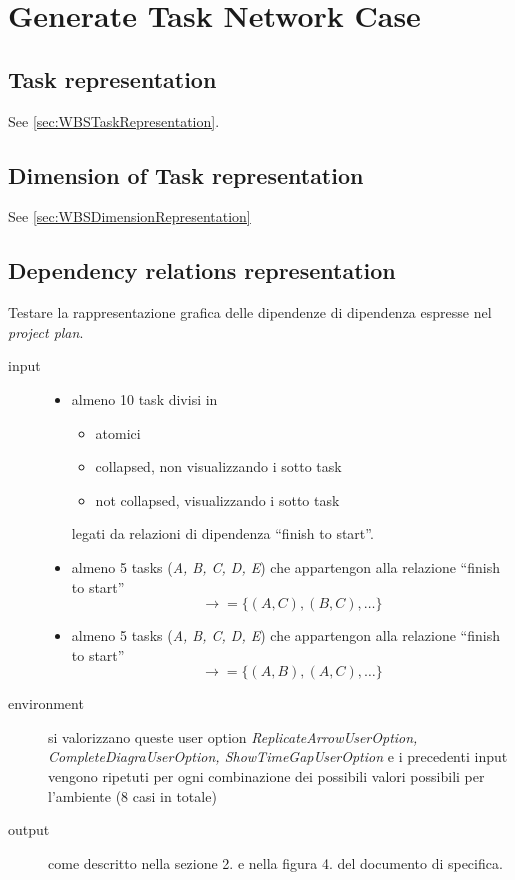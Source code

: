 \chapter{Generate Task Network Case}
\label{chap:generateTaskNetwork}

\section{Task representation}
See \ref{sec:WBSTaskRepresentation}.

\section{Dimension of Task representation}
See \ref{sec:WBSDimensionRepresentation}

\section{Dependency relations representation}
Testare la rappresentazione grafica delle dipendenze di dipendenza espresse
nel \emph{project plan}.
\begin{description}
\item[input]  \quad
\begin{itemize}
  \item almeno 10 task divisi in 
  \begin{itemize}
  \item atomici
  \item collapsed, non visualizzando i sotto task
  \item not collapsed, visualizzando i sotto task 
  \end{itemize} legati da relazioni di dipendenza ``finish to start''.
  \item almeno 5 tasks (\emph{A, B, C, D, E}) che appartengon alla
relazione ``finish to start'' $$\rightarrow = \lbrace (A, C), (B, C), \ldots
\rbrace$$   
  \item almeno 5 tasks (\emph{A, B, C, D, E}) che appartengon alla
relazione ``finish to start'' $$\rightarrow = \lbrace (A, B), (A, C), \ldots
\rbrace$$
\end{itemize}
\item[environment] si valorizzano queste user option
\emph{ReplicateArrowUserOption, \\CompleteDiagraUserOption,
ShowTimeGapUserOption} e i precedenti input vengono ripetuti per ogni
combinazione dei possibili valori possibili per l'ambiente (8 casi in totale)
\item[output] come descritto nella sezione 2. e nella figura 4. del
documento di specifica.
\end{description}

